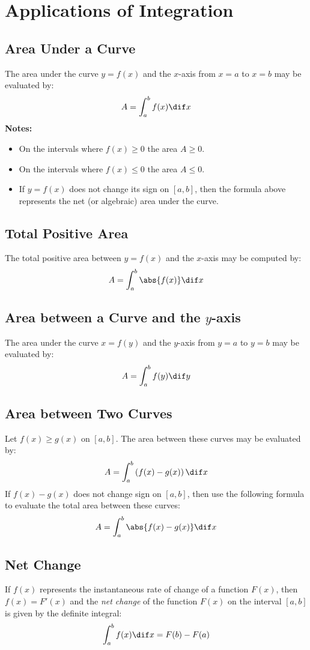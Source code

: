 \section{Applications of Integration}
\subsection{Area Under a Curve}
	The area under the curve $y=f(x)$ and the $x$-axis from $x=a$ to $x=b$ may be evaluated by:
	\[A = \int_a^b f(x) \dif x\]
	\textbf{Notes:}
	\begin{itemize}
		\item On the intervals where $f(x) \geq 0$ the area $A \geq 0$.
		\item On the intervals where $f(x) \leq 0$ the area $A \leq 0$.
		\item If $y=f(x)$ does not change its sign on $[a,b]$, then the formula above represents the net (or algebraic) area under the curve.
	\end{itemize}
\subsection{Total Positive Area}
	The total positive area between $y=f(x)$ and the $x$-axis may be computed by:
	\[A = \int_a^b \abs{f(x)} \dif x\]
\subsection{Area between a Curve and the $y$-axis}
	The area under the curve $x=f(y)$ and the $y$-axis from $y=a$ to $y=b$ may be evaluated by:
	\[A = \int_a^b f(y) \dif y\]
\subsection{Area between Two Curves}
	Let $f(x) \geq g(x)$ on $[a,b]$. The area between these curves may be evaluated by:
	\[A = \int_a^b \left( f(x) - g(x) \right) \dif x\]
	If $f(x) - g(x)$ does not change sign on $[a,b]$, then use the following formula to evaluate the total area between these curves:
	\[A = \int_a^b \abs{f(x) - g(x)} \dif x\]
\subsection{Net Change}
	If $f(x)$ represents the instantaneous rate of change of a function $F(x)$, then $f(x) = F'(x)$ and the \emph{net change} of the function $F(x)$ on the interval $[a,b]$ is given by the definite integral:
	\[\int_a^b f(x) \dif x = F(b) - F(a)\]
